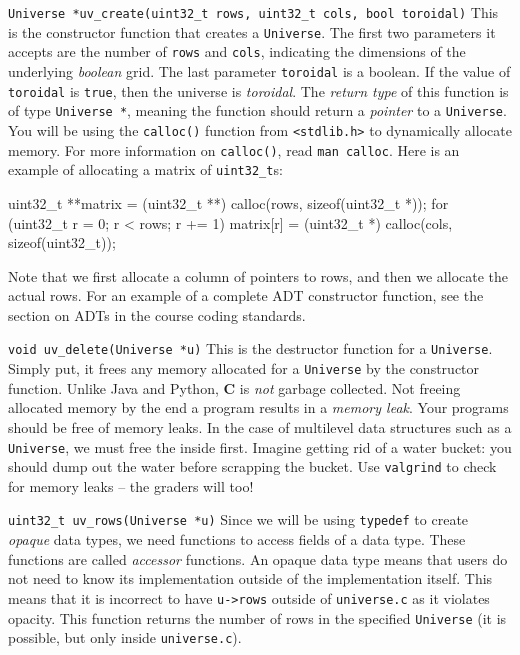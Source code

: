 \begin{funcdoc}{\texttt{Universe *uv\_create(uint32\_t rows, uint32\_t cols, bool toroidal)}}
  This is the constructor function that creates a \texttt{Universe}. The first two
  parameters it accepts are the number of \texttt{rows} and \texttt{cols},
  indicating the dimensions of the underlying \emph{boolean} grid. The last
  parameter \texttt{toroidal} is a boolean. If the value of \texttt{toroidal} is
  \texttt{true}, then the universe is \emph{toroidal}. The \emph{return type} of
  this function is of type \texttt{Universe *}, meaning the function should return
  a \emph{pointer} to a \texttt{Universe}. You will be using the \texttt{calloc()}
  function from \texttt{<stdlib.h>} to dynamically allocate memory. For more
  information on \texttt{calloc()}, read \texttt{man calloc}. Here is an example
  of allocating a matrix of \texttt{uint32\_t}s:

\begin{clisting}{}
uint32_t **matrix = (uint32_t **) calloc(rows, sizeof(uint32_t *));
for (uint32_t r = 0; r < rows; r += 1) {
    matrix[r] = (uint32_t *) calloc(cols, sizeof(uint32_t));
}
\end{clisting}

  Note that we first allocate a column of pointers  to rows, and then we allocate
  the actual rows. For an example of a complete ADT constructor function, see the
  section on ADTs in the course coding standards.
\end{funcdoc}

\begin{funcdoc}{\texttt{void uv\_delete(Universe *u)}}
  This is the destructor function for a \texttt{Universe}. Simply put, it frees
  any memory allocated for a \texttt{Universe} by the constructor function.
  Unlike Java and Python, \textbf{C} is \emph{not} garbage collected. Not
  freeing allocated memory by the end a program results in a \emph{memory leak}.
  Your programs should be free of memory leaks. In the case of multilevel data
  structures such as a \texttt{Universe}, we must free the inside first. Imagine
  getting rid of a water bucket: you should dump out the water before scrapping
  the bucket. Use \texttt{valgrind} to check for memory leaks -- the graders
  will too!
\end{funcdoc}

\begin{funcdoc}{\texttt{uint32\_t uv\_rows(Universe *u)}}
  Since we will be using \texttt{typedef} to create \emph{opaque} data types, we
  need functions to access fields of a data type. These functions are called
  \emph{accessor} functions. An opaque data type means that users do not need to
  know its implementation outside of the implementation itself. This means that
  it is incorrect to have \texttt{u->rows} outside of \texttt{universe.c} as it
  violates opacity. This function returns the number of rows in the specified
  \texttt{Universe} (it is possible, but only inside \texttt{universe.c}).
\end{funcdoc}

